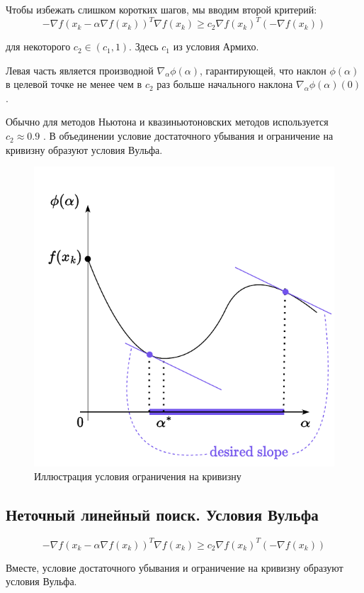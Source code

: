 \documentclass[
  russian,
  letterpaper,
  DIV=11,
  numbers=noendperiod]{scrartcl}
\begin{document}
Чтобы избежать слишком коротких шагов, мы вводим второй критерий: \[
-\nabla f (x_k - \alpha \nabla f(x_k))^T \nabla f(x_k) \geq c_2 \nabla f(x_k)^T(- \nabla f(x_k))
\]

для некоторого \(c_2 \in (c_1,1)\). Здесь \(c_1\) из условия Армихо.

Левая часть является производной \(\nabla_\alpha \phi(\alpha)\),
гарантирующей, что наклон \(\phi(\alpha)\) в целевой точке не менее чем
в \(c_2\) раз больше начального наклона
\(\nabla_\alpha \phi(\alpha)(0)\).

Обычно для методов Ньютона и квазиньютоновских методов используется
\(c_2 \approx 0.9\) . В объединении условие достаточного убывания и
ограничение на кривизну образуют условия Вульфа.

\begin{figure}[H]

{\centering \includegraphics[width=0.35\linewidth,height=\textheight,keepaspectratio]{Curvature.pdf}

}

\caption{Иллюстрация условия ограничения на кривизну}

\end{figure}%

\subsection{Неточный линейный поиск. Условия
Вульфа}\label{ux43dux435ux442ux43eux447ux43dux44bux439-ux43bux438ux43dux435ux439ux43dux44bux439-ux43fux43eux438ux441ux43a.-ux443ux441ux43bux43eux432ux438ux44f-ux432ux443ux43bux44cux444ux430}

\[
-\nabla f (x_k - \alpha \nabla f(x_k))^T \nabla f(x_k) \geq c_2 \nabla f(x_k)^T(- \nabla f(x_k))
\]

Вместе, условие достаточного убывания и ограничение на кривизну образуют
условия Вульфа.
\end{document}
